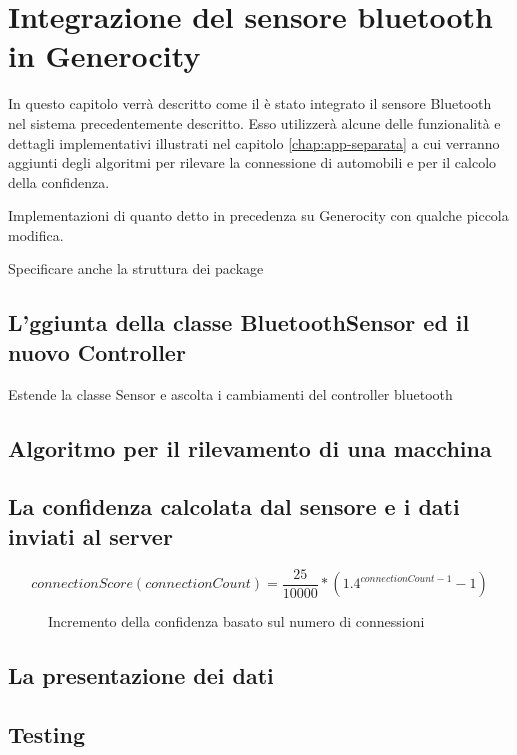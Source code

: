 \chapter{Integrazione del sensore bluetooth in Generocity} \label{chap:Bluetooth-sensor}
In questo capitolo verrà descritto come il è stato integrato il sensore Bluetooth nel sistema precedentemente descritto. Esso utilizzerà alcune delle funzionalità e dettagli implementativi illustrati nel capitolo \ref{chap:app-separata} a cui verranno aggiunti degli algoritmi per rilevare la connessione di automobili e per il calcolo della confidenza.

Implementazioni di quanto detto in precedenza su Generocity con qualche piccola modifica.

Specificare anche la struttura dei package

\section{L'ggiunta della classe BluetoothSensor ed il nuovo Controller}
Estende la classe Sensor e ascolta i cambiamenti del controller bluetooth

\section{Algoritmo per il rilevamento di una macchina}

\section{La confidenza calcolata dal sensore e i dati inviati al server}
\[connectionScore(connectionCount) = \frac{25}{10000} * (1.4^{connectionCount-1} - 1)\]

\begin{figure}[t]
    \centering
    \caption{Incremento della confidenza basato sul numero di connessioni}
    \label{fig:confidence-func}
\end{figure}

\section{La presentazione dei dati}
\section{Testing}